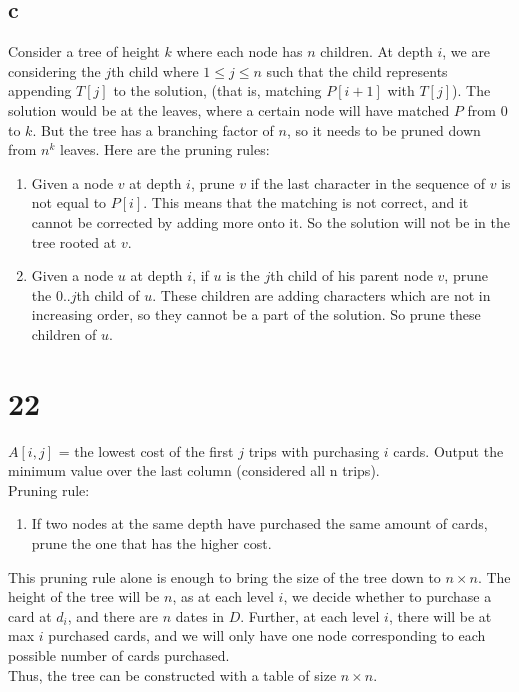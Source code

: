 \documentclass[letterpaper,notitlepage,twoside]{article}
\begin{document}
\subsection*{c}
Consider a tree of height $k$ where each node has $n$ children. At depth $i$, we are considering the $j$th child where $1 \leq j \leq n$  such that the child represents appending $T[j]$ to the solution, (that is, matching $P[i + 1]$ with $T[j]$). The solution would be at the leaves, where a certain node will have matched $P$ from $0$ to $k$. But the tree has a branching factor of $n$, so it needs to be pruned down from $n^k$ leaves. Here are the pruning rules:
\begin{enumerate}
\item Given a node $v$ at depth $i$, prune $v$ if the last character in the sequence of $v$ is not equal to $P[i]$. This means that the matching is not correct, and it cannot be corrected by adding more onto it. So the solution will not be in the tree rooted at $v$.
\item Given a node $u$ at depth $i$, if $u$ is the $j$th child of his parent node $v$, prune the $0..j$th child of $u$. These children are adding characters which are not in increasing order, so they cannot be a part of the solution. So prune these children of $u$.
\end{enumerate}

\section*{22}
$A[i, j]$ = the lowest cost of the first $j$ trips with purchasing $i$ cards. Output the minimum value over the last column (considered all n trips). 
\\
Pruning rule:
\begin{enumerate}
\item If two nodes at the same depth have purchased the same amount of cards, prune the one that has the higher cost. 
\end{enumerate}
This pruning rule alone is enough to bring the size of the tree down to $n\times n$. The height of the tree will be $n$, as at each level $i$, we decide whether to purchase a card at $d_i$, and there are $n$ dates in $D$. Further, at each level $i$, there will be at max $i$ purchased cards, and we will only have one node corresponding to each possible number of cards purchased.  \\
Thus, the tree can be constructed with a table of size $n\times n$. 
\end{document}
